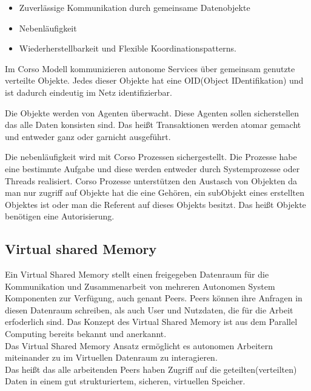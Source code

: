 \documentclass[a4paper,12pt]{scrreprt}
\begin{document}
			\begin{itemize}
			\item Zuverlässige Kommunikation durch gemeinsame Datenobjekte
			\item Nebenläufigkeit
			\item Wiederherstellbarkeit und Flexible Koordinationspatterns.
			\end{itemize}
			
			Im Corso Modell kommunizieren autonome Services über gemeinsam genutzte verteilte Objekte. Jedes dieser Objekte hat eine OID(Object IDentifikation) und ist dadurch eindeutig im Netz identifizierbar.
			
			Die Objekte werden von Agenten überwacht. Diese Agenten sollen sicherstellen das alle Daten konsisten sind. Das heißt Transaktionen werden atomar gemacht und entweder ganz oder garnicht ausgeführt.
			
			Die nebenläufigkeit wird mit Corso Prozessen sichergestellt. Die Prozesse habe eine bestimmte Aufgabe und diese werden entweder durch Systemprozesse oder Threads realisiert.
			Corso Prozesse unterstützen den Austasch von Objekten da man nur zugriff auf Objekte hat die eine Gehören, ein subObjekt eines erstellten Objektes ist oder man die Referent auf dieses Objekts besitzt.
			Das heißt Objekte benötigen eine Autorisierung.
			
			
			
						
			\subsection{Virtual shared Memory}
			
			
			Ein Virtual Shared Memory stellt einen freigegeben Datenraum für die Kommunikation und Zusammenarbeit von mehreren Autonomen System Komponenten zur Verfügung, auch genant Peers. Peers können ihre Anfragen in diesen Datenraum schreiben, als auch User und Nutzdaten, die für die Arbeit erfoderlich sind.
			Das Konzept des Virtual Shared Memory ist aus dem Parallel Computing bereits bekannt und anerkannt.\\
			Das Virtual Shared Memory Ansatz ermöglicht es autonomen Arbeitern miteinander zu im Virtuellen Datenraum zu interagieren.\\
			Das heißt das alle arbeitenden Peers haben Zugriff auf die geteilten(verteilten) Daten in einem gut strukturiertem, sicheren, virtuellen Speicher.
			 
			
			
			  
		
\end{document}
